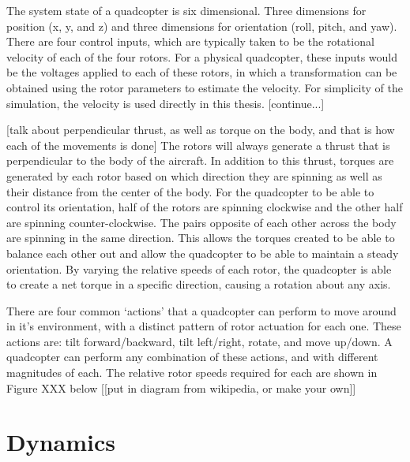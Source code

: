 \documentclass[letterpaper,12pt,titlepage,oneside,final]{book}
\begin{document}

The system state of a quadcopter is six dimensional. Three dimensions for position (x, y, and z) and three dimensions for orientation (roll, pitch, and yaw). There are four control inputs, which are typically taken to be the rotational velocity of each of the four rotors. For a physical quadcopter, these inputs would be the voltages applied to each of these rotors, in which a transformation can be obtained using the rotor parameters to estimate the velocity. For simplicity of the simulation, the velocity is used directly in this thesis. [continue...]

[talk about perpendicular thrust, as well as torque on the body, and that is how each of the movements is done]
The rotors will always generate a thrust that is perpendicular to the body of the aircraft. In addition to this thrust, torques are generated by each rotor based on which direction they are spinning as well as their distance from the center of the body. For the quadcopter to be able to control its orientation, half of the rotors are spinning clockwise and the other half are spinning counter-clockwise. The pairs opposite of each other across the body are spinning in the same direction. This allows the torques created to be able to balance each other out and allow the quadcopter to be able to maintain a steady orientation. By varying the relative speeds of each rotor, the quadcopter is able to create a net torque in a specific direction, causing a rotation about any axis.

There are four common ‘actions’ that a quadcopter can perform to move around in it’s environment, with a distinct pattern of rotor actuation for each one. These actions are: tilt forward/backward, tilt left/right, rotate, and move up/down. A quadcopter can perform any combination of these actions, and with different magnitudes of each. The relative rotor speeds required for each are shown in Figure XXX below [[put in diagram from wikipedia, or make your own]]

\section{Dynamics}

\end{document}

